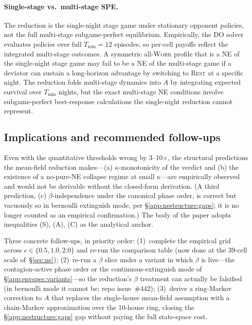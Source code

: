 \documentclass{anvil-paper}
\begin{document}
\paragraph{Single-stage vs.\ multi-stage SPE.}
The reduction is the single-night stage game under stationary opponent
policies, not the full multi-stage subgame-perfect equilibrium.
Empirically, the DO solver evaluates policies over full
$T_{\min}{=}12$ episodes, so per-cell payoffs reflect the integrated
multi-stage outcomes. A symmetric all-\textsc{Work} profile that is a
NE of the single-night stage game may fail to be a NE of the
multi-stage game if a deviator can sustain a long-horizon advantage by
switching to \textsc{Rest} at a specific night. The reduction folds
multi-stage dynamics into $A$ by integrating expected survival over
$T_{\min}$ nights, but the exact multi-stage NE conditions involve
subgame-perfect best-response calculations the single-night reduction
cannot represent.

\subsection{Implications and recommended follow-ups}
\label{app:nestructure:followups}

Even with the quantitative thresholds wrong by 3--10$\times$, the
structural predictions the mean-field reduction makes---(a)
$\kappa$-monotonicity of the verdict and (b) the existence of a
no-pure-NE collapse regime at small $\kappa$---are empirically observed
and would not be derivable without the closed-form derivation. (A third
prediction, (c) $\beta$-independence under the canonical phase order, is
correct but vacuously so in bernoulli extinguish mode, per
\S\ref{app:nestructure:gaps}; it is no longer counted as an empirical
confirmation.) The body of the paper
adopts inequalities (S), (A), (C) as the analytical anchor.

Three concrete follow-ups, in priority order:
(1)~complete the empirical grid across $c\in\{0.5,1.0,2.0\}$ and
re-run the comparison table (now done at the 39-cell scale
of~\S\ref{sec:ne}); (2)~re-run a $\beta$ slice under a variant in which
$\beta$ is live---the contagion-active phase order or the
continuous-extinguish mode of \S\ref{app:envspec:variants}---so the
reduction's $\beta$ treatment can actually be falsified (in bernoulli
mode it cannot be; repo issue~\#442); (3)~derive a ring-Markov correction to
$A$ that replaces the single-house mean-field assumption with a
chain-Markov approximation over the 10-house ring, closing the
\S\ref{app:nestructure:gaps} gap without paying the full state-space
cost.
\end{document}
